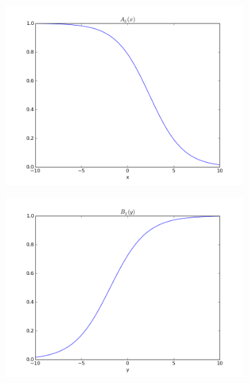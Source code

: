 \documentclass[paper=a4, fontsize=11pt]{scrartcl} %
\numberwithin{equation}{section} %
\numberwithin{figure}{section} %
\numberwithin{table}{section} %
\begin{document}
\begin{figure}[h]
\begin{subfigure}[b]{0.45\textwidth}
\includegraphics[width=\textwidth]{img/figure_5.png}
\end{subfigure}
\begin{subfigure}[b]{0.45\textwidth}
\includegraphics[width=\textwidth]{img/figure_6.png}
\end{subfigure}


\end{figure}
\end{document}
